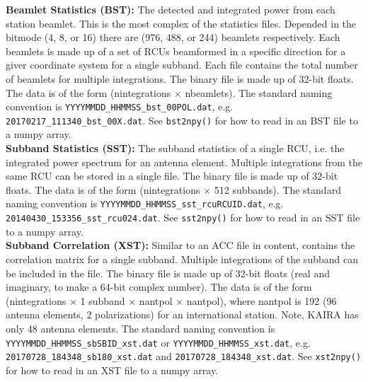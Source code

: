 \documentclass[10pt,a4paper]{article}
\begin{document}
\noindent\textbf{Beamlet Statistics (BST):} The detected and integrated power
from each station beamlet. This is the most complex of the statistics files.
Depended in the bitmode (4, 8, or 16) there are (976, 488, or 244) beamlets
respectively. Each beamlets is made up of a set of RCUs beamformed in a specific
direction for a giver coordinate system for a single subband. Each file contains
the total number of beamlets for multiple integrations. The binary file is made
up of 32-bit floats. The data is of the form (nintegrations $\times$ nbeamlets).
The standard naming convention is \texttt{YYYYMMDD\_HHMMSS\_bst\_00POL.dat}, e.g.
\texttt{20170217\_111340\_bst\_00X.dat}.  See \texttt{bst2npy()} for how to read in
an BST file to a numpy array.
\\

\noindent\textbf{Subband Statistics (SST):} The subband statistics of a single
RCU, i.e. the integrated power spectrum for an antenna element. Multiple
integrations from the same RCU can be stored in a single file. The binary file
is made up of 32-bit floats. The data is of the form (nintegrations $\times$ 512
subbands). The standard naming convention is
\texttt{YYYYMMDD\_HHMMSS\_sst\_rcuRCUID.dat}, e.g.
\texttt{20140430\_153356\_sst\_rcu024.dat}.  See \texttt{sst2npy()} for how to
read in an SST file to a numpy array.
\\

\noindent\textbf{Subband Correlation (XST):} Similar to an ACC file in content,
contains the correlation matrix for a single subband. Multiple integrations of
the subband can be included in the file. The binary file is made up of 32-bit
floats (real and imaginary, to make a 64-bit complex number). The data is of the
form (nintegrations $\times$ 1 subband $\times$ nantpol $\times$ nantpol), where
nantpol is 192 (96 antenna elements, 2 polarizations) for an international
station. Note, KAIRA has only 48 antenna elements.  The standard naming
convention is \texttt{YYYYMMDD\_HHMMSS\_sbSBID\_xst.dat} or
\texttt{YYYYMMDD\_HHMMSS\_xst.dat}, e.g. \\
\texttt{20170728\_184348\_sb180\_xst.dat} and
\texttt{20170728\_184348\_xst.dat}.  See \texttt{xst2npy()} for how to read in
an XST file to a numpy array.
\\
\end{document}
